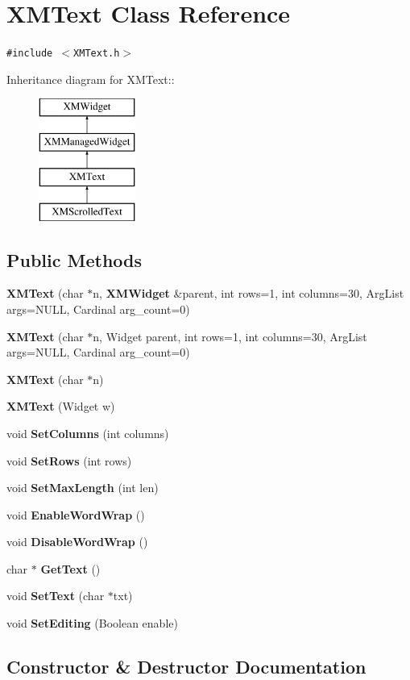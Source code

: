 \section{XMText  Class Reference}
\label{classXMText}
{\tt \#include $<$XMText.h$>$}

Inheritance diagram for XMText::\begin{figure}[H]
\begin{center}
\leavevmode
\includegraphics[height=4cm]{classXMText}
\end{center}
\end{figure}
\subsection*{Public Methods}
\begin{CompactItemize}
\item 
{\bf XMText} (char $\ast$n, {\bf XMWidget} \&parent, int rows=1, int columns=30, Arg\-List args=NULL, Cardinal arg\_\-count=0)
\item 
{\bf XMText} (char $\ast$n, Widget parent, int rows=1, int columns=30, Arg\-List args=NULL, Cardinal arg\_\-count=0)
\item 
{\bf XMText} (char $\ast$n)
\item 
{\bf XMText} (Widget w)
\item 
void {\bf Set\-Columns} (int columns)
\item 
void {\bf Set\-Rows} (int rows)
\item 
void {\bf Set\-Max\-Length} (int len)
\item 
void {\bf Enable\-Word\-Wrap} ()
\item 
void {\bf Disable\-Word\-Wrap} ()
\item 
char $\ast$ {\bf Get\-Text} ()
\item 
void {\bf Set\-Text} (char $\ast$txt)
\item 
void {\bf Set\-Editing} (Boolean enable)
\end{CompactItemize}


\subsection{Constructor \& Destructor Documentation}
